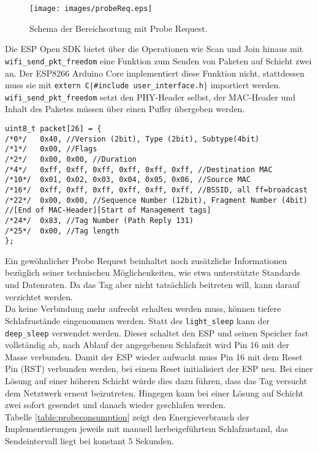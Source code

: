 \begin{figure}[h]
  \centering
	\texttt{[image: images/probeReq.eps]}
  \caption{Schema der Bereichsortung mit Probe Request.}
  \label{fig:probeReq}
\end{figure}


Die ESP Open SDK bietet über die Operationen wie Scan und Join hinaus mit \texttt{wifi\_send\_pkt\_freedom} eine Funktion zum Senden von Paketen auf Schicht zwei an.
Der ESP8266 Arduino Core implementiert diese Funktion nicht, stattdessen muss sie mit \texttt{extern \dq C\dq $\lbrace$\#include \dq user\_interface.h\dq $\rbrace$} importiert werden. \\
\texttt{wifi\_send\_pkt\_freedom} setzt den PHY-Header selbst, der MAC-Header und Inhalt des Paketes müssen über einen Puffer übergeben werden.
\begin{verbatim}
uint8_t packet[26] = { 
/*0*/ 	0x40, //Version (2bit), Type (2bit), Subtype(4bit)
/*1*/ 	0x00, //Flags 
/*2*/ 	0x00, 0x00, //Duration
/*4*/   0xff, 0xff, 0xff, 0xff, 0xff, 0xff, //Destination MAC
/*10*/  0x01, 0x02, 0x03, 0x04, 0x05, 0x06, //Source MAC
/*16*/  0xff, 0xff, 0xff, 0xff, 0xff, 0xff, //BSSID, all ff=broadcast
/*22*/  0x00, 0x00, //Sequence Number (12bit), Fragment Number (4bit) 
//[End of MAC-Header][Start of Management tags]
/*24*/  0x83, //Tag Number (Path Reply 131) 
/*25*/ 	0x00, //Tag length
}; 
\end{verbatim}
Ein gewöhnlicher Probe Request beinhaltet noch zusätzliche Informationen bezüglich seiner technischen Möglichenkeiten, wie etwa unterstützte Standards und Datenraten. 
Da das Tag aber nicht tatsächlich beitreten will, kann darauf verzichtet werden. \\
Da keine Verbindung mehr aufrecht erhalten werden muss, können tiefere Schlafzustände eingenommen werden. 
Statt des \texttt{light\_sleep} kann der \texttt{deep\_sleep} verwendet werden.
Dieser schaltet den ESP und seinen Speicher fast vollständig ab, nach Ablauf der angegebenen Schlafzeit wird Pin 16 mit der Masse verbunden.
Damit der ESP wieder aufwacht muss Pin 16 mit dem Reset Pin (RST) verbunden werden, bei einem Reset initialisiert der ESP neu.
Bei einer Lösung auf einer höheren Schicht würde dies dazu führen, dass das Tag versucht dem Netztwerk erneut beizutreten. 
Hingegen kann bei einer Lösung auf Schicht zwei sofort gesendet und danach wieder geschlafen werden.\\
Tabelle \ref{table:probeconsumption} zeigt den Energieverbrauch der Implementierungen jeweils mit manuell herbeigeführtem Schlafzustand, das Sendeintervall liegt bei konstant 5 Sekunden.
